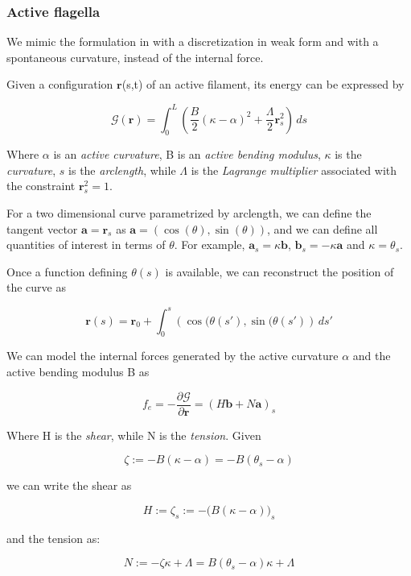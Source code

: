 
\subsubsection{Active flagella}
We mimic the formulation in \cite{julicher} with a discretization in weak form and with a spontaneous curvature, instead of the internal force.




Given a configuration $\mathbf{r}$(s,t) of an active filament, its energy can be expressed by

\[\mathcal{G}(\mathbf{r}) = \int_0^L \left( \frac{B}{2}(\kappa-\alpha)^2 +
  \frac{\Lambda}{2} \mathbf{r}_s^2 \right) \,d s\]

Where $\alpha$ is an \emph{active curvature}, B is an \emph{active
  bending modulus}, $\kappa$ is the \emph{curvature}, $s$ is the
\emph{arclength}, while $\Lambda$ is the \emph{Lagrange multiplier}
associated with the constraint $\mathbf{r}_s^2 = 1$.

For a two dimensional curve parametrized by arclength, we can define
the tangent vector $\mathbf{a} = \mathbf{r}_s$ as $\mathbf{a} = (\cos(\theta), \sin(\theta))$, and
we can define all quantities of interest in terms of $\theta$. For
example, $\mathbf{a}_s = \kappa \mathbf{b}$, $\mathbf{b}_s = -\kappa \mathbf{a}$ and $\kappa = \theta_s$.

Once a function defining \(\theta(s)\) is available, we can reconstruct
the position of the curve as

\[\mathbf{r}(s) = \mathbf{r}_0 + \int_0^s \left(\cos(\theta(s'), \sin(\theta(s') \right)
\,d s'\]

We can model the internal forces generated by the active curvature
$\alpha$ and the active bending modulus B as

\[f_e = -\frac{\partial \mathcal{G}}{\partial \mathbf{r}} = (H \mathbf{b} + N \mathbf{a})_s\]

Where H is the \emph{shear}, while N is the
\emph{tension}. Given 

\[\zeta := -B(\kappa - \alpha) = -B(\theta_s - \alpha)\]

we can write the shear as

\[H := \zeta_s := -\big( B(\kappa - \alpha) \big)_s\]

and the tension as:

\[N := -\zeta\kappa + \Lambda = B(\theta_s-\alpha)\kappa +\Lambda\]

\label{sec:resist-force-theory}



